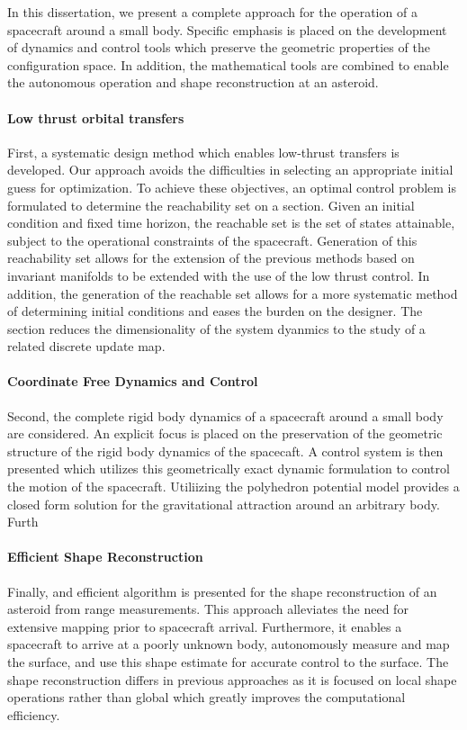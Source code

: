 In this dissertation, we present a complete approach for the operation of a spacecraft around a small body. 
Specific emphasis is placed on the development of dynamics and control tools which preserve the geometric properties of the configuration space. 
In addition, the mathematical tools are combined to enable the autonomous operation and shape reconstruction at an asteroid.

\paragraph{Low thrust orbital transfers}
First, a systematic design method which enables low-thrust transfers is developed.
Our approach avoids the difficulties in selecting an appropriate initial guess for optimization.
To achieve these objectives, an optimal control problem is formulated to determine the reachability set on a \Poincare section.
Given an initial condition and fixed time horizon, the reachable set is the set of states attainable, subject to the operational constraints of the spacecraft. 
Generation of this reachability set allows for the extension of the previous methods based on invariant manifolds to be extended with the use of the low thrust control.
In addition, the generation of the reachable set allows for a more systematic method of determining initial conditions and eases the burden on the designer. 
The \Poincare section reduces the dimensionality of the system dyanmics to the study of a related discrete update map.  

\paragraph{Coordinate Free Dynamics and Control}
Second, the complete rigid body dynamics of a spacecraft around a small body are considered.
An explicit focus is placed on the preservation of the geometric structure of the rigid body dynamics of the spacecaft.
A control system is then presented which utilizes this geometrically exact dynamic formulation to control the motion of the spacecraft. 
Utiliizing the polyhedron potential model provides a closed form solution for the gravitational attraction around an arbitrary body. 
Furth

\paragraph{Efficient Shape Reconstruction}
Finally, and efficient algorithm is presented for the shape reconstruction of an asteroid from range measurements. 
This approach alleviates the need for extensive mapping prior to spacecraft arrival. 
Furthermore, it enables a spacecraft to arrive at a poorly unknown body, autonomously measure and map the surface, and use this shape estimate for accurate control to the surface.
The shape reconstruction differs in previous approaches as it is focused on local shape operations rather than global which greatly improves the computational efficiency.

